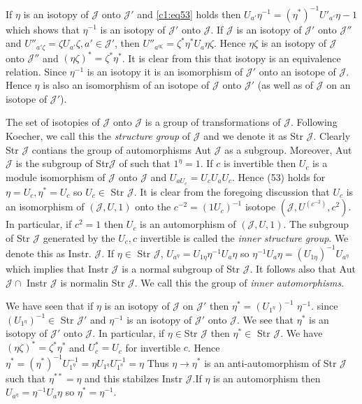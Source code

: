 \begin{defn}
  If $\eta$ is an isotopy of $\mathscr{J}$ onto $\mathscr{J}'$ and
  \eqref{c1:eq53} 
  holds then $U_{a'}\eta^{-1}=(\eta^{\ast})^{-1}U'_{a'}\eta-1$ which
  shows that $\eta^{-1}$ is an isotopy of $\mathscr{J}'$ onto
  $\mathscr{J}$. If $\mathscr{J}$ is an isotopy of $\mathscr{J}'$ onto
  $\mathscr{J}''$ and $U''_{a'\zeta}=\zeta U_{a'}\zeta,a'\in
  \mathscr{J}'$, then
  $U''_{a^{\eta\zeta}}=\zeta^{\ast}\eta^{\ast}U_a\eta\zeta$. Hence
  $\eta\zeta$ is an isotopy of $\mathscr{J}$ onto $\mathscr{J}''$ and
  $(\eta\zeta)^{\ast}=\zeta^{\ast}\eta^{\ast}$. It is clear from this
  that isotopy is an equivalence relation. Since $\eta^{-1}$ is an
  isotopy it is an isomorphism of $\mathscr{J}'$ onto an isotope of
  $\mathscr{J}$. Hence $\eta$ is also an isomorphism of an isotope of
  $\mathscr{J}$ onto $\mathscr{J}'$ (as well as of $\mathscr{J}$ on an
  isotope of $\mathscr{J}'$).

The set of isotopies of $\mathscr{J}$ onto $\mathscr{J}$ is a group of
transformations of $\mathscr{J}$. Following Koecher, we call this the
{\em structure group} of $\mathscr{J}$ and we denote it as Str
$\mathscr{J}$. Clearly Str $\mathscr{J}$ contians the group of
automorphisms Aut $\mathscr{J}$ as a subgroup. Moreover, Aut
$\mathscr{J}$ is the subgroup of Str$\mathscr{J}$ of such that
$1^{\eta}=1$. If $c$ is invertible then $U_c$ is a module isomorphism
of $\mathscr{J}$ onto $\mathscr{J}$ and $U_{aU_c}=U_cU_aU_c$. Hence
(53) holds for $\eta=U_c,\eta^{\ast}=U_c$ so $U_c\in$ Str
$\mathscr{J}$. It is clear from the foregoing discussion that $U_c$ is
an isomorphism of $(\mathscr{J},U,1)$ onto the $c^{-2}=(1U_c)^{-1}$
isotope $(\mathscr{J}, U^{(c^{-2})},c^{2})$. In particular, if
$c^{2}=1$ then $U_c$ is an automorphism of $(\mathscr{J},U,1)$. The
subgroup of Str $\mathscr{J}$ generated by the $U_c,c$ invertible is
called the {\em inner structure group}. We denote this as
Instr. $\mathscr{J}$. If $\eta \in$ Str $\mathscr{J}$,
$U_{a^{\eta}}=U_{1\eta}\eta^{-1}U_a\eta$ so
$\eta^{-1}U_a\eta=(U_{1\eta})^{-1}U_{a^{\eta}}$ which implies that
Instr $\mathscr{J}$ is a normal subgroup of Str $\mathscr{J}$. It
follows also that Aut $\mathscr{J}\cap$ Instr $\mathscr{J}$ is
normal\pageoriginale in Str $\mathscr{J}$. We call this the group of
{\em inner automorphisms}.

We have seen that if $\eta$ is an isotopy of $\mathscr{J}$ on
$\mathscr{J}'$ then $\eta^{\ast}=(U_{1^\eta})^{-1}$ $\eta^{-1}$. since
$(U_{1^\eta})^{-1}\in$ Str $\mathscr{J}'$ and $\eta^{-1}$ is an
isotopy of $\mathscr{J}'$ onto $\mathscr{J}$. We see that
$\eta^{\ast}$ is an isotopy of $\mathscr{J}'$ onto $\mathscr{J}$. In
particular, if $\eta\in$Str $\mathscr{J}$ then
$\eta^{\ast}\in$ Str $\mathscr{J}$. We have
$(\eta\zeta)^{\ast}=\zeta^{\ast}\eta^{\ast}$ and $U^{\ast}_c=U_c$ for
invertible $c$. Hence
$\eta^{\ast}=(\eta^{\ast})^{-1}U^{-1}_{1^{\eta}}=\eta
U_{1^{\eta}}U^{-1}_{1^{n}}=\eta$ Thus $\eta \to \eta^{\ast}$ is an
anti-automorphism of Str $\mathscr{J}$ such that
$\eta^{\ast\ast}=\eta$ and this stabilzes Instr $\mathscr{J}$.If
$\eta$ is an automorphism then $U_{a^{\eta}}=\eta^{-1}U_a\eta$ so
$\eta^{\ast}=\eta^{-1}$.


\end{defn}
